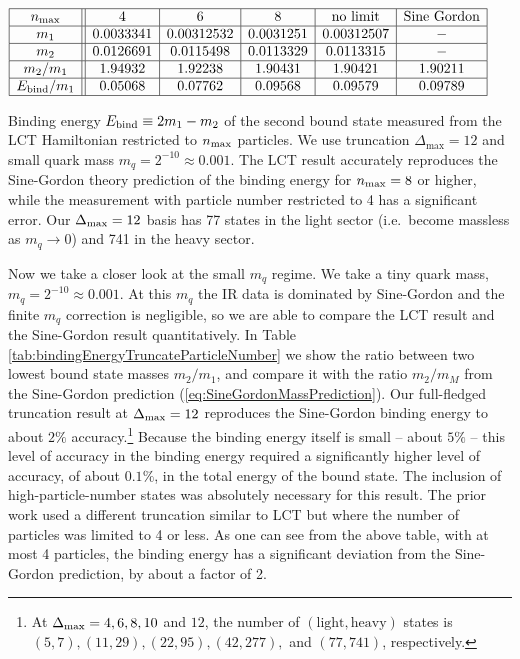 \documentclass[12pt]{article}
\newcommand\De\Delta
\newcommand{\Dmax}{\De_{\max}}
\begin{document}
\begin{table}[htbp]
\centering
$
\begin{array}{|c||c|c|c|c|c|}
\hline
 n_{\max} & 4 & 6 & 8 & \text{no limit} & \text{Sine Gordon} \\
\hline
 m_1 & 0.0033341 & 0.00312532 & 0.0031251 & 0.00312507 & - \\
\hline
 m_2 & 0.0126691 & 0.0115498 & 0.0113329 & 0.0113315 & - \\
\hline 
m_2/m_1 & 1.94932 & 1.92238 & 1.90431 & 1.90421 & 1.90211 \\
\hline
 E_{\rm bind}/m_1 & 0.05068 & 0.07762 & 0.09568 & 0.09579 & 0.09789 \\
\hline
\end{array}
$
\caption{
    \label{tab:bindingEnergyTruncateParticleNumber}
    Binding energy $E_{\rm bind} \equiv 2m_1-m_2$ of the second bound state measured from the LCT Hamiltonian restricted to $n_{\rm max}$ particles. We use truncation $\Dmax = 12$ and small quark mass $m_q=2^{-10}\approx0.001$. The LCT result accurately reproduces the Sine-Gordon theory prediction of the binding energy for $n_{\rm max} = 8$ or higher, while the measurement with particle number restricted to 4 has a significant error.  Our $\Delta_{\rm max}=12$ basis has 77 states in the light sector (i.e.~become massless as $m_q \rightarrow 0$) and 741 in the heavy sector.
}
\end{table}

Now we take a closer look at the small $m_q$ regime. We take a tiny quark mass, $m_q = 2^{-10} \approx 0.001$. At this $m_q$ the IR data is dominated by Sine-Gordon and the finite $m_q$ correction is negligible, so we are able to compare the LCT result and the Sine-Gordon result quantitatively.
In Table \ref{tab:bindingEnergyTruncateParticleNumber} we show the ratio between two lowest bound state masses $m_2/m_1$, and compare it with the ratio $m_2/m_M$ from the Sine-Gordon prediction (\ref{eq:SineGordonMassPrediction}). Our full-fledged truncation result at $\Delta_{\rm max}=12$ reproduces the Sine-Gordon binding energy to about $2\%$ accuracy.\footnote{At $\Delta_{\rm max}=4,6,8,10$ and $12$, the number of $(\textrm{light},\textrm{heavy})$ states is $(5,7), (11,29), (22,95), (42, 277),$ and $(77,741)$, respectively.} Because the binding energy itself is small -- about $5\%$ -- this level of accuracy in the binding energy required a significantly higher level of accuracy, of about $0.1 \%$, in the total energy of the bound state.  The inclusion of high-particle-number states was absolutely necessary for this result.  The prior work \cite{Sugihara} used a different truncation similar to LCT but where the number of particles was limited to 4 or less. As one can see from the above table, with at most 4 particles, the binding energy has a significant deviation from the Sine-Gordon prediction, by about a factor of 2.
\end{document}
